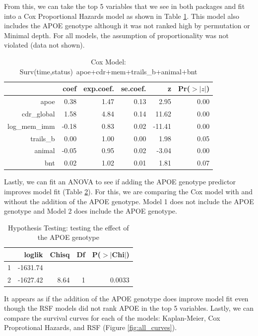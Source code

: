 \documentclass[a4paper,man,natbib,11pt]{article}
\begin{document}
From this, we can take the top 5 variables that we see in both packages and fit into a Cox Proportional Hazards model as shown in Table \ref{cox_coef}. This model also includes the APOE genotype although it was not ranked high by permutation or Minimal depth. For all models, the assumption of proportionality was not violated (data not shown).   

\begin{table}[ht]
\centering
\caption{Cox Model: Surv(time,status)~apoe+cdr+mem+trails\_b+animal+bnt}
\begin{tabular}{rrrrrr}
  \hline
 & coef & exp.coef. & se.coef. & z & Pr($>$$|z|$) \\ 
  \hline
apoe & 0.38 & 1.47 & 0.13 & 2.95 & 0.00 \\ 
  cdr\_global & 1.58 & 4.84 & 0.14 & 11.62 & 0.00 \\ 
  log\_mem\_imm & -0.18 & 0.83 & 0.02 & -11.41 & 0.00 \\ 
  trails\_b & 0.00 & 1.00 & 0.00 & 1.98 & 0.05 \\ 
  animal & -0.05 & 0.95 & 0.02 & -3.04 & 0.00 \\ 
  bnt & 0.02 & 1.02 & 0.01 & 1.81 & 0.07 \\ 
   \hline
\end{tabular}
\label{cox_coef}
\end{table}


Lastly, we can fit an ANOVA to see if adding the APOE genotype predictor improves model fit (Table \ref{anova}). For this, we are comparing the Cox model with and without the addition of the APOE genotype. Model 1 does not include the APOE genotype and Model 2 does include the APOE genotype. 

\begin{table}[ht]
\centering
\caption{Hypothesis Testing: testing the effect of the APOE genotype}
\begin{tabular}{lrrrr}
  \hline
 & loglik & Chisq & Df & P($>$$|$Chi$|$) \\ 
  \hline
1 & -1631.74 &  &  &  \\ 
  2 & -1627.42 & 8.64 & 1 & 0.0033 \\ 
   \hline
\end{tabular}
\label{anova}
\end{table}

It appears as if the addition of the APOE genotype does improve model fit even though the RSF models did not rank APOE in the top 5 variables. Lastly, we can compare the survival curves for each of the models: Kaplan-Meier, Cox Proprotional Hazards, and RSF (Figure \ref{fig:all_curves}). 
\end{document}
